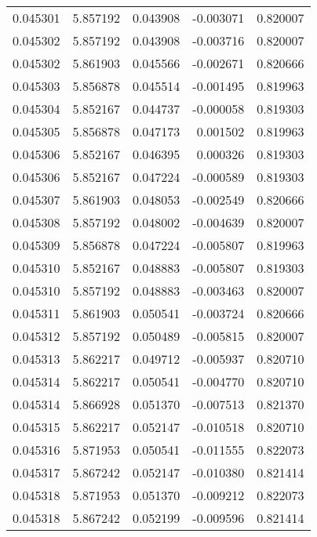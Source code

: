 \begin{tabular}{lrrrr}
0.045301    &  5.857192 &  0.043908 & -0.003071 &             0.820007 \\
0.045302    &  5.857192 &  0.043908 & -0.003716 &             0.820007 \\
0.045302    &  5.861903 &  0.045566 & -0.002671 &             0.820666 \\
0.045303    &  5.856878 &  0.045514 & -0.001495 &             0.819963 \\
0.045304    &  5.852167 &  0.044737 & -0.000058 &             0.819303 \\
0.045305    &  5.856878 &  0.047173 &  0.001502 &             0.819963 \\
0.045306    &  5.852167 &  0.046395 &  0.000326 &             0.819303 \\
0.045306    &  5.852167 &  0.047224 & -0.000589 &             0.819303 \\
0.045307    &  5.861903 &  0.048053 & -0.002549 &             0.820666 \\
0.045308    &  5.857192 &  0.048002 & -0.004639 &             0.820007 \\
0.045309    &  5.856878 &  0.047224 & -0.005807 &             0.819963 \\
0.045310    &  5.852167 &  0.048883 & -0.005807 &             0.819303 \\
0.045310    &  5.857192 &  0.048883 & -0.003463 &             0.820007 \\
0.045311    &  5.861903 &  0.050541 & -0.003724 &             0.820666 \\
0.045312    &  5.857192 &  0.050489 & -0.005815 &             0.820007 \\
0.045313    &  5.862217 &  0.049712 & -0.005937 &             0.820710 \\
0.045314    &  5.862217 &  0.050541 & -0.004770 &             0.820710 \\
0.045314    &  5.866928 &  0.051370 & -0.007513 &             0.821370 \\
0.045315    &  5.862217 &  0.052147 & -0.010518 &             0.820710 \\
0.045316    &  5.871953 &  0.050541 & -0.011555 &             0.822073 \\
0.045317    &  5.867242 &  0.052147 & -0.010380 &             0.821414 \\
0.045318    &  5.871953 &  0.051370 & -0.009212 &             0.822073 \\
0.045318    &  5.867242 &  0.052199 & -0.009596 &             0.821414 \\

\end{tabular}
